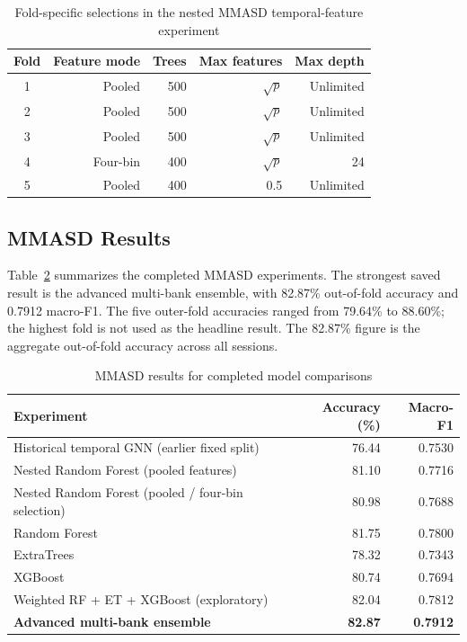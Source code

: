 \documentclass[a4paper,12pt]{report}
\begin{document}
\begin{table}[htbp]
\centering
\small
\caption{Fold-specific selections in the nested MMASD temporal-feature experiment}
\label{tab:mmasd_nested_parameters}
\begin{tabular}{crrrr}
\hline
\textbf{Fold} & \textbf{Feature mode} & \textbf{Trees} & \textbf{Max features} & \textbf{Max depth} \\
\hline
1 & Pooled & 500 & $\sqrt{p}$ & Unlimited \\
2 & Pooled & 500 & $\sqrt{p}$ & Unlimited \\
3 & Pooled & 500 & $\sqrt{p}$ & Unlimited \\
4 & Four-bin & 400 & $\sqrt{p}$ & 24 \\
5 & Pooled & 400 & 0.5 & Unlimited \\
\hline
\end{tabular}
\end{table}

\subsection*{MMASD Results}

Table~\ref{tab:mmasd_progression} summarizes the completed MMASD experiments. The strongest saved result is the advanced multi-bank ensemble, with 82.87\% out-of-fold accuracy and 0.7912 macro-F1. The five outer-fold accuracies ranged from 79.64\% to 88.60\%; the highest fold is not used as the headline result. The 82.87\% figure is the aggregate out-of-fold accuracy across all sessions.

\begin{table}[htbp]
\centering
\small
\setlength{\tabcolsep}{8pt}
\renewcommand{\arraystretch}{1.15}
\caption{MMASD results for completed model comparisons}
\label{tab:mmasd_progression}
\begin{tabular}{p{8.3cm}rr}
\hline
\textbf{Experiment} & \textbf{Accuracy (\%)} & \textbf{Macro-F1} \\
\hline
Historical temporal GNN (earlier fixed split) & 76.44 & 0.7530 \\
Nested Random Forest (pooled features) & 81.10 & 0.7716 \\
Nested Random Forest (pooled / four-bin selection) & 80.98 & 0.7688 \\
Random Forest & 81.75 & 0.7800 \\
ExtraTrees & 78.32 & 0.7343 \\
XGBoost & 80.74 & 0.7694 \\
Weighted RF + ET + XGBoost (exploratory) & 82.04 & 0.7812 \\
\textbf{Advanced multi-bank ensemble} & \textbf{82.87} & \textbf{0.7912} \\
\hline
\end{tabular}
\end{table}
\end{document}
